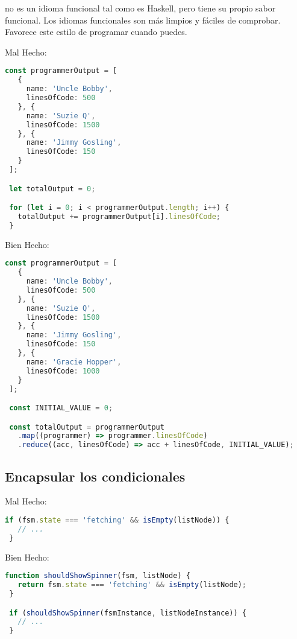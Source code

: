  no es un idioma funcional tal como es Haskell, pero tiene su propio sabor funcional. Los idiomas funcionales son más limpios y fáciles de comprobar. Favorece este estilo de programar cuando puedes.

Mal Hecho:
\begin{lstlisting}[language=TypeScript, style=badstyle]
 const programmerOutput = [
   {
     name: 'Uncle Bobby',
     linesOfCode: 500
   }, {
     name: 'Suzie Q',
     linesOfCode: 1500
   }, {
     name: 'Jimmy Gosling',
     linesOfCode: 150
   }
 ];

 let totalOutput = 0;

 for (let i = 0; i < programmerOutput.length; i++) {
   totalOutput += programmerOutput[i].linesOfCode;
 }
\end{lstlisting}
\newpage

Bien Hecho:
\begin{lstlisting}[language=TypeScript, style=goodstyle]
 const programmerOutput = [
   {
     name: 'Uncle Bobby',
     linesOfCode: 500
   }, {
     name: 'Suzie Q',
     linesOfCode: 1500
   }, {
     name: 'Jimmy Gosling',
     linesOfCode: 150
   }, {
     name: 'Gracie Hopper',
     linesOfCode: 1000
   }
 ];

 const INITIAL_VALUE = 0;

 const totalOutput = programmerOutput
   .map((programmer) => programmer.linesOfCode)
   .reduce((acc, linesOfCode) => acc + linesOfCode, INITIAL_VALUE);
\end{lstlisting}

\subsection*{Encapsular los condicionales}

Mal Hecho:
\begin{lstlisting}[language=TypeScript, style=badstyle]
 if (fsm.state === 'fetching' && isEmpty(listNode)) {
   // ...
 }
\end{lstlisting}
\vspace{0.5cm} %

Bien Hecho:
 \begin{lstlisting}[language=TypeScript, style=goodstyle]
 function shouldShowSpinner(fsm, listNode) {
   return fsm.state === 'fetching' && isEmpty(listNode);
 }

 if (shouldShowSpinner(fsmInstance, listNodeInstance)) {
   // ...
 }
\end{lstlisting}


